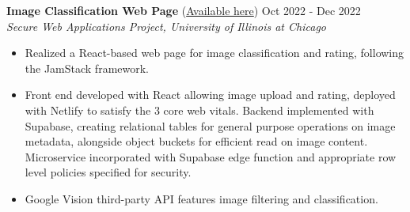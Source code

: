 
\noindent
\textbf{Image Classification Web Page} (\href{https://github.com/GiuseppeCalderonio/ImageClassificationWebApp}{Available here}) \hfill Oct 2022 - Dec 2022 \\
\textit{Secure Web Applications Project, University of Illinois at Chicago}
\begin{itemize}[noitemsep,topsep=0pt]
    \item Realized a React-based web page for image classification and rating, following the JamStack framework.
    \item Front end developed with React allowing image upload and rating, deployed with Netlify to satisfy the 3 core web vitals. Backend implemented with Supabase, creating relational tables for general purpose operations on image metadata, alongside object buckets for efficient read on image content. Microservice incorporated with Supabase edge function and appropriate row level policies specified for security.
    \item Google Vision third-party API features image filtering and classification.
\end{itemize}

\vspace{4pt}

